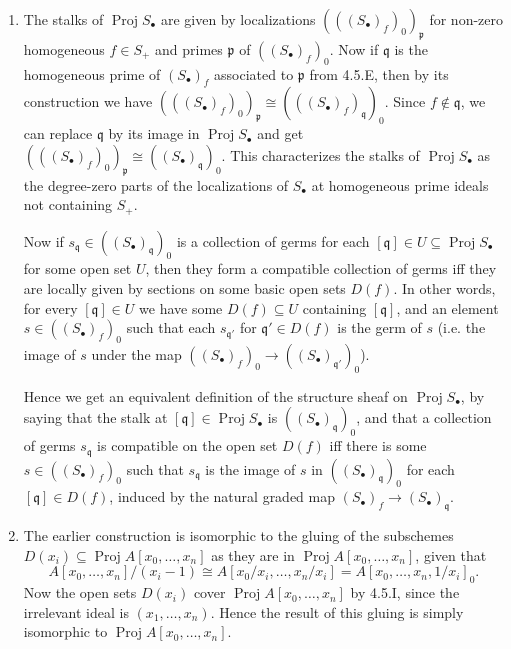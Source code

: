 \documentclass{report}
\newcommand{\p}{\mathfrak{p}}
\newcommand{\q}{\mathfrak{q}}
\DeclareMathOperator{\Proj}{Proj}
\begin{document}
\begin{enumerate}[label=\textbf{4.5.\Alph*.}]
	\item The stalks of $\Proj S_\bullet$ are given by localizations
	      $(((S_\bullet)_f)_0)_\p$ for non-zero homogeneous $f\in S_+$ and primes
	      $\p$ of $((S_\bullet)_f)_0$. Now if $\q$ is the homogeneous prime of
	      $(S_\bullet)_f$ associated to $\p$ from 4.5.E, then by its construction
	      we have $(((S_\bullet)_f)_0)_\p\cong(((S_\bullet)_f)_\q)_0$. Since
	      $f\notin\q$, we can replace $\q$ by its image in $\Proj S_\bullet$ and
	      get $(((S_\bullet)_f)_0)_\p\cong((S_\bullet)_\q)_0$. This characterizes
	      the stalks of $\Proj S_\bullet$ as the degree-zero parts of the
	      localizations of $S_\bullet$ at homogeneous prime ideals not
	      containing $S_+$.

	      Now if $s_{\q}\in((S_\bullet)_\q)_0$ is a collection of germs for each
	      $[\q]\in U\subseteq\Proj S_\bullet$ for some open set $U$, then they
	      form a compatible collection of germs iff they are locally given by
	      sections on some basic open sets $D(f)$. In other words, for every
	      $[\q]\in U$ we have some $D(f)\subseteq U$ containing $[\q]$, and an
	      element $s\in((S_\bullet)_f)_0$ such that each $s_{\q'}$ for
	      $\q'\in D(f)$ is the germ of $s$ (i.e. the image of $s$ under the map
	      $((S_\bullet)_f)_0\to((S_\bullet)_{\q'})_0$).

	      Hence we get an equivalent definition of the structure sheaf on
	      $\Proj S_\bullet$, by saying that the stalk at $[\q]\in\Proj S_\bullet$
	      is $((S_\bullet)_\q)_0$, and that a collection of germs $s_\q$ is
	      compatible on the open set $D(f)$ iff there is some
	      $s\in((S_\bullet)_f)_0$ such that $s_\q$ is the image of $s$ in
	      $((S_\bullet)_{\q})_0$ for each $[\q]\in D(f)$, induced by the natural
	      graded map $(S_\bullet)_f\to(S_\bullet)_\q$.

	\item The earlier construction is isomorphic to the gluing of the
	      subschemes $D(x_i)\subseteq\Proj A[x_0,\ldots,x_n]$ as they are in
	      $\Proj A[x_0,\ldots,x_n]$, given that
	      \begin{equation*}
		      A[x_0,\ldots,x_n]/(x_i-1)
		      \cong A[x_0/x_i,\ldots,x_n/x_i]
		      = A[x_0,\ldots,x_n,1/x_i]_0.
	      \end{equation*}
	      Now the open sets $D(x_i)$ cover $\Proj A[x_0,\ldots,x_n]$ by 4.5.I,
	      since the irrelevant ideal is $(x_1,\ldots,x_n)$. Hence the result of
	      this gluing is simply isomorphic to $\Proj A[x_0,\ldots,x_n]$.


\end{enumerate}
\end{document}
